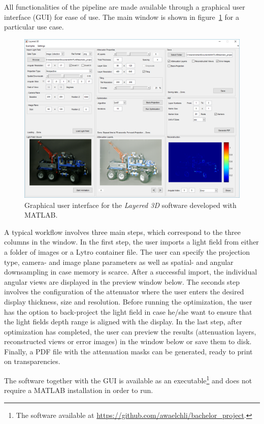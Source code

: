 All functionalities of the pipeline are made available through a graphical user interface \mbox{(GUI)} for ease of use.
The main window is shown in figure~\ref{fig:gui_overview} for a particular use case.
\begin{figure}[tb]
	\includegraphics[width = \linewidth]{../Figures/gui/overview}
	\caption[Graphical user interface]
			{Graphical user interface for the \emph{Layered 3D} software developed with MATLAB.}
	\label{fig:gui_overview}
\end{figure}
A typical workflow involves three main steps, which correspond to the three columns in the window.
In the first step, the user imports a light field from either a folder of images or a \mbox{Lytro} container file.
The user can specify the projection type, camera- and image plane parameters as well as spatial- and angular downsampling in case memory is scarce.
After a successful import, the individual angular views are displayed in the preview window below.
The seconds step involves the configuration of the attenuator where the user enters the desired display thickness, size and resolution.
Before running the optimization, the user has the option to back-project the light field in case he/she want to ensure that the light fields depth range is aligned with the display.
In the last step, after optimization has completed, the user can preview the results (attenuation layers, reconstructed views or error images) in the window below or save them to disk.
Finally, a \mbox{PDF} file with the attenuation masks can be generated, ready to print on transparencies.

The software together with the GUI is available as an executable\footnote{The software available at \url{https://github.com/awaelchli/bachelor_project}.} 
and does not require a \mbox{MATLAB} installation in order to run.

